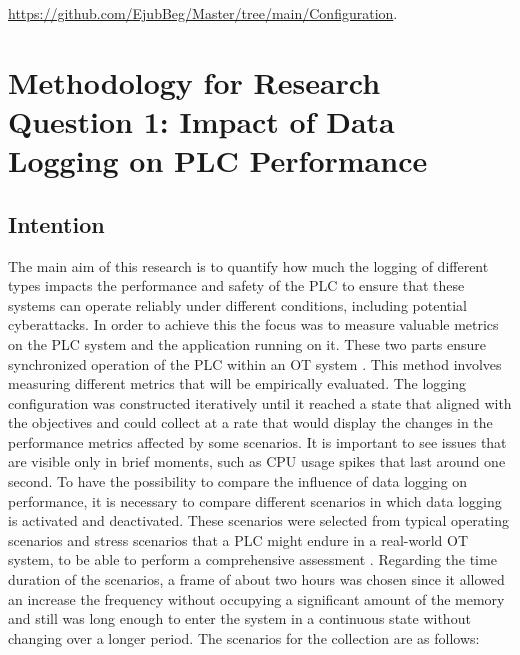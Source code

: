 \documentclass[Master,BMR,english]{twbook}
\begin{document}
\href{https://github.com/EjubBeg/Master/tree/main/Configuration}{https://github.com/EjubBeg/Master/tree/main/Configuration}.


\section{Methodology for Research Question 1: Impact of Data Logging on PLC Performance}

\subsection{Intention}

The main aim of this research is to quantify how much the logging of different types impacts the performance and safety of the PLC to ensure that these systems can operate reliably under different conditions, including potential cyberattacks. In order to achieve this the focus was to measure valuable metrics on the PLC system and the application running on it. These two parts ensure synchronized operation of the PLC within an OT system \cite{bolton_programmable_2007}. This method involves measuring different metrics that will be empirically evaluated. The logging configuration was constructed iteratively until it reached a state that aligned with the objectives and could collect at a rate that would display the changes in the performance metrics affected by some scenarios. It is important to see issues that are visible only in brief moments, such as CPU usage spikes that last around one second. To have the possibility to compare the influence of data logging on performance, it is necessary to compare different scenarios in which data logging is activated and deactivated. These scenarios were selected from typical operating scenarios and stress scenarios that a PLC might endure in a real-world OT system, to be able to perform a comprehensive assessment \cite{nistir_8089}. Regarding the time duration of the scenarios, a frame of about two hours was chosen since it allowed an increase the frequency without occupying a significant amount of the memory and still was long enough to enter the system in a continuous state without changing over a longer period. The scenarios for the collection are as follows:
\end{document}
